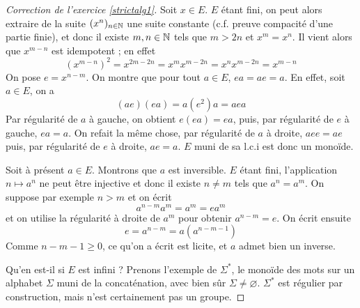 \begin{proof}[Correction de l'exercice \ref{strictalg1}]
    Soit $x\in E$. $E$ étant fini, on peut alors extraire de la suite $(x^n)_{n\in\operatorname{\mathbb N}}$ une suite constante (c.f. preuve compacité d'une partie finie), 
    et donc il existe $m,n \in\operatorname{\mathbb N}$ tels que $m>2n$ et $x^m=x^n$. Il vient alors que $x^{m-n}$ est idempotent ; en effet \[(x^{m-n})^2=x^{2m-2n}=x^mx^{m-2n}=x^nx^{m-2n}=x^{m-n}\]
    On pose $e=x^{n-m}$. On montre que pour tout $a\in E$, $ea=ae=a$. En effet, soit $a\in E$, on a \[(ae)(ea)=a(e^2)a=aea\]
    Par régularité de $a$ à gauche, on obtient $e(ea)=ea$, puis, par régularité de $e$ à gauche, $ea=a$. 
    On refait la même chose, par régularité de $a$ à droite, $aee=ae$ puis, par régularité de $e$ à droite, $ae=a$. $E$ muni de sa l.c.i est donc un monoïde.

    Soit à présent $a\in E$. Montrons que $a$ est inversible. $E$ étant fini, l'application $n\mapsto a^n$ ne peut être injective et donc il existe $n\neq m$ tels que $a^n=a^m$. 
    On suppose par exemple $n>m$ et on écrit \[a^{n-m}a^m=a^m=ea^m\]
    et on utilise la régularité à droite de $a^m$ pour obtenir $a^{n-m}=e$. On écrit ensuite \[e=a^{n-m}=a(a^{n-m-1})\]
    Comme $n-m-1\geq 0$, ce qu'on a écrit est licite, et $a$ admet bien un inverse.
 
    Qu'en est-il si $E$ est infini ? Prenons l'exemple de $\Sigma^*$, le monoïde des mots sur un alphabet $\Sigma$ muni de la concaténation, 
    avec bien sûr $\Sigma\neq\varnothing$. $\Sigma^*$  est régulier par construction, mais n'est certainement pas un groupe.
\end{proof}